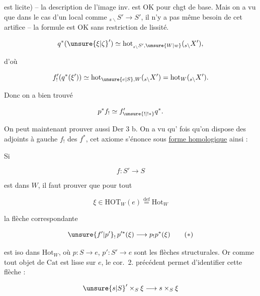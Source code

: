 
est licite) --  la description de l'image inv. est OK pour \uline{} chgt de base. Mais on a vu que dans le cas d'un  local comme $ {}_{s\backslash}S'\longrightarrow S'$, il n'y a pas même besoin de cet artifice -- la formule est OK sans restriction de lissité.


\[
 q^*(\unsure{\xi|\zeta}')\simeq\mathrm{hot}_{{}_{s\backslash}S',\unsure{W|w}}({}_{s\backslash}X'),
\]

d'où

\[
 f'_!(q^*(\xi'))\simeq\mathrm{hot}_{\unsure{e|S},W}({}_{s\backslash}X')=\mathrm{hot}_W({}_{s\backslash}X').
\]

Donc on a bien trouvé

\[
 p^*f_!\simeq f'_{\unsure{!|!*}}q^*.
\]

On peut maintenant prouver aussi Der 3 b. On a vu qu'  fois qu'on dispose des adjoints à gauche $f_!$ des $f^*$, cet axiome s'énonce sous \uline{forme homologique} ainsi :

Si

\[
 f:S'\longrightarrow S
\]

est dans $W$, il faut prouver que pour tout

\[
 \xi\in\mathrm{HOT}_W(e)\overset{\mathrm{def}}{=}\mathrm{Hot}_W
\]

la flèche correspondante

\[
 \unsure{f'|p'}_!\,p'^*(\xi)\longrightarrow p_!p^*(\xi)\tag*{$(*)$}
\]

est iso dans $\mathrm{Hot}_W$, où $p:S\longrightarrow e$, $p':S'\longrightarrow e$ sont les flèches structurales. Or comme tout objet de $\mathrm{Cat}$ est lisse sur $e$, le cor.~2. précédent permet d'identifier cette flèche  :

\[
 \unsure{s|S}'\times_S\xi\longrightarrow s\times_S\xi
\]


